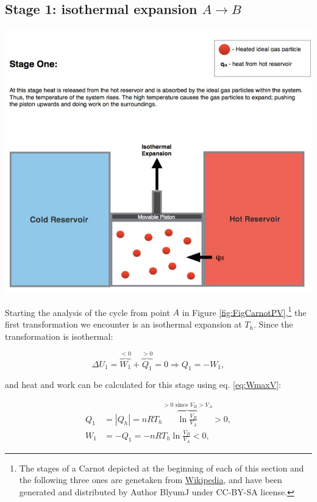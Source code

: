 \documentclass[
  9pt,
]{extbook}
\theoremstyle{definition}
\theoremstyle{definition}
\theoremstyle{definition}
\theoremstyle{remark}
\begin{document}
\hypertarget{CCstage1}{%
\subsection{\texorpdfstring{Stage 1: isothermal expansion \(A \rightarrow B\)}{Stage 1: isothermal expansion A \textbackslash rightarrow B}}\label{CCstage1}}

\begin{center}\includegraphics[width=0.7\linewidth]{./img/OEP_Figures.007a} \end{center}

Starting the analysis of the cycle from point \(A\) in Figure \ref{fig:FigCarnotPV},\footnote{The stages of a Carnot depicted at the beginning of each of this section and the following three ones are genetaken from \href{https://en.wikipedia.org/wiki/Carnot_cycle}{Wikipedia}, and have been generated and distributed by Author BlyumJ under CC-BY-SA license.} the first transformation we encounter is an isothermal expansion at \(T_h\). Since the transformation is isothermal:

\begin{equation}
\Delta U_1 = \overbrace{W_1}^{<0} + \overbrace{Q_1}^{>0} = 0 \Rightarrow Q_1 = -W_1,
  \label{eq:CCst1}
\end{equation}

and heat and work can be calculated for this stage using eq. \eqref{eq:WmaxV}:

\begin{equation}
\begin{aligned}
 Q_1 & = \left| Q_h \right|  = nRT_h \overbrace{\ln \frac{V_B}{V_A}}^{>0 \text{ since } V_B>V_A} > 0, \\
 W_1 & = -Q_1 = - nRT_h \ln \frac{V_B}{V_A} < 0,
\end{aligned}
  \label{eq:CCst1b}
\end{equation}
\end{document}
